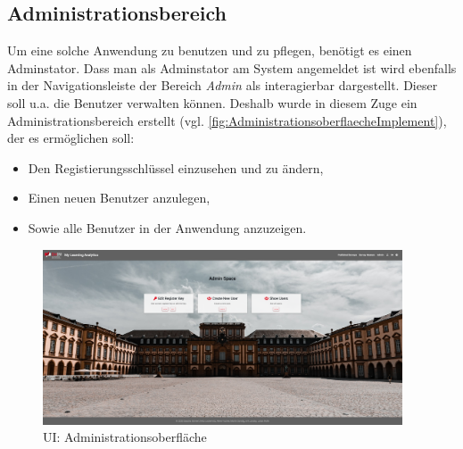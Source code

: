 
\subsection{Administrationsbereich}
\label{ssec:Administrationsbereich}

Um eine solche Anwendung zu benutzen und zu pflegen, benötigt es einen Adminstator.
Dass man als Adminstator am System angemeldet ist wird ebenfalls in der Navigationsleiste der Bereich \emph{Admin} als interagierbar dargestellt.
Dieser soll u.a. die Benutzer verwalten können. 
Deshalb wurde in diesem Zuge ein Administrationsbereich erstellt (vgl. \vref{fig:AdministrationsoberflaecheImplement}), der es ermöglichen soll: 
%
\begin{itemize}
    \item Den Registierungsschlüssel einzusehen und zu ändern,
    \item Einen neuen Benutzer anzulegen,
    \item Sowie alle Benutzer in der Anwendung anzuzeigen. 
\end{itemize}
%
\begin{figure}[hp]
	\centering
	\includegraphics[width=0.95\textwidth, keepaspectratio]{img/client/Admin.png}
	\captionsetup{justification=centering, format=plain}
	\caption[\acf{UI}: Administrationsoberfläche]{\acf{UI}: Administrationsoberfläche \\ \quelleScreenshot}
	\label{fig:AdministrationsoberflaecheImplement}
\end{figure}
%






